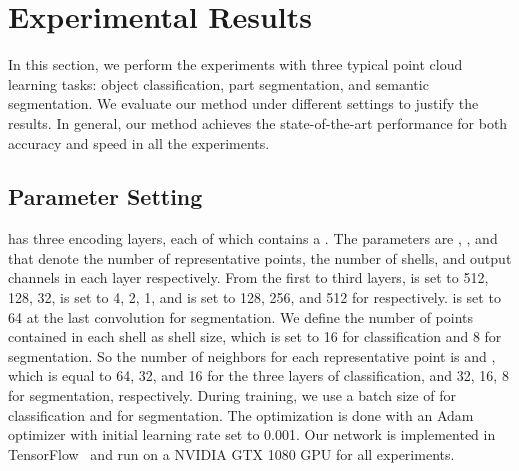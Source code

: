 \documentclass[10pt,twocolumn,letterpaper]{article}
\begin{document}
\section{Experimental Results}
\label{experiment}

In this section, we perform the experiments with three typical point cloud learning tasks: object classification, part segmentation, and semantic segmentation. We evaluate our method under different settings to justify the results. In general, our method achieves the state-of-the-art performance for both accuracy and speed in all the experiments. 

\subsection{Parameter Setting}
\label{sub:param_setting}
\ournet has three encoding layers, each of which contains a \ourconv. The parameters are , , and  that denote the number of representative points, the number of shells, and output channels in each layer respectively. From the first to third layers,  is set to 512, 128, 32,  is set to 4, 2, 1, and  is set to 128, 256, and 512 for  respectively.  is set to 64 at the last convolution for segmentation. 
We define the number of points contained in each shell as shell size, which is set to 16 for classification and 8 for segmentation. So the number of neighbors for each representative point is  and , which is equal to 64, 32, and 16 for the three layers of classification, and 32, 16, 8 for segmentation, respectively. 
During training, we use a batch size of  for classification and  for segmentation. The optimization is done with an Adam optimizer with initial learning rate set to 0.001. Our network is implemented in TensorFlow~\cite{abadi2016tensorflow} and run on a NVIDIA GTX 1080 GPU for all experiments.
\end{document}
